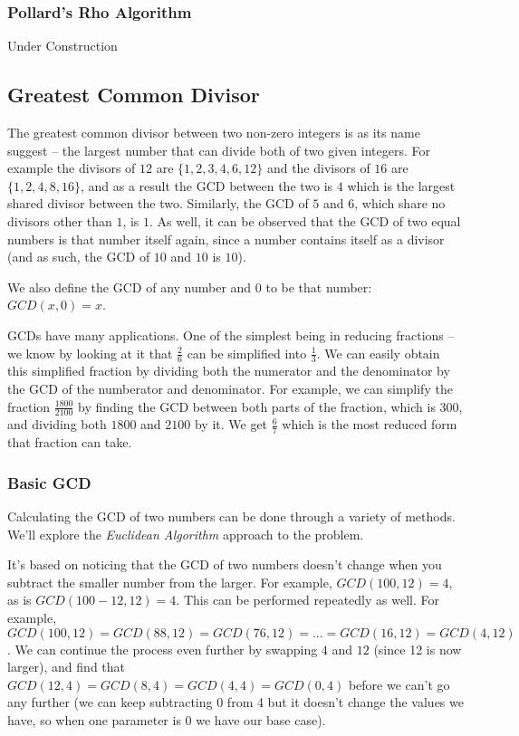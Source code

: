 
\subsubsection{Pollard's Rho Algorithm}

Under Construction

\subsection{Greatest Common Divisor}

The greatest common divisor between two non-zero integers is as its name suggest -- the largest number that can divide both of two given integers. For example the divisors of $12$ are $\{1,2,3,4,6,12\}$ and the divisors of $16$ are $\{1,2,4,8,16\}$, and as a result the GCD between the two is $4$ which is the largest shared divisor between the two. Similarly, the GCD of $5$ and $6$, which share no divisors other than $1$, is $1$. As well, it can be observed that the GCD of two equal numbers is that number itself again, since a number contains itself as a divisor (and as such, the GCD of $10$ and $10$ is $10$).

We also define the GCD of any number and 0 to be that number: $GCD(x,0) = x$.

GCDs have many applications. One of the simplest being in reducing fractions -- we know by looking at it that $\frac{2}{6}$ can be simplified into $\frac{1}{3}$. We can easily obtain this simplified fraction by dividing both the numerator and the denominator by the GCD of the numberator and denominator. For example, we can simplify the fraction $\frac{1800}{2100}$ by finding the GCD between both parts of the fraction, which is 300, and dividing both $1800$ and $2100$ by it. We get $\frac{6}{7}$ which is the most reduced form that fraction can take.

\subsubsection{Basic GCD}

Calculating the GCD of two numbers can be done through a variety of methods. We'll explore the \textit{Euclidean Algorithm} approach to the problem.

It's based on noticing that the GCD of two numbers doesn't change when you subtract the smaller number from the larger. For example, $GCD(100, 12) = 4$, as is $GCD(100-12, 12) = 4$. This can be performed repeatedly as well. For example, $GCD(100, 12) = GCD(88, 12) = GCD(76, 12) = ... = GCD(16, 12) = GCD(4, 12)$. We can continue the process even further by swapping $4$ and $12$ (since 12 is now larger), and find that $GCD(12, 4) = GCD(8, 4) = GCD(4, 4) = GCD(0, 4)$ before we can't go any further (we can keep subtracting 0 from 4 but it doesn't change the values we have, so when one parameter is 0 we have our base case).

